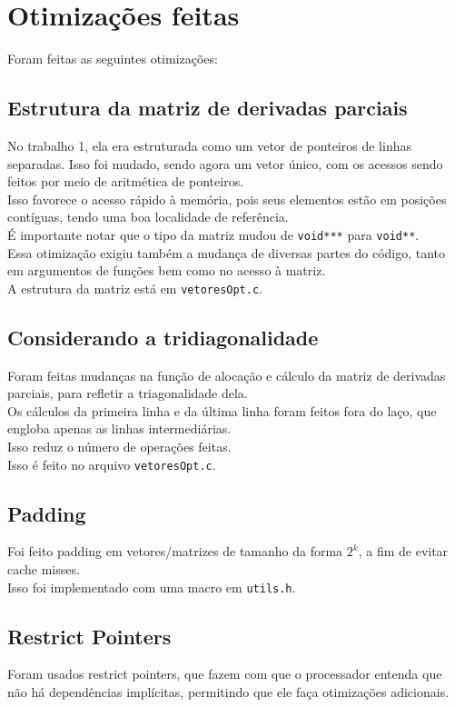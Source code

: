 \documentclass{article}
\begin{document}
\newpage
\section{Otimizações feitas}
Foram feitas as seguintes otimizações:

\subsection{Estrutura da matriz de derivadas parciais}
No trabalho 1, ela era estruturada como um vetor de ponteiros de linhas separadas. Isso foi mudado, sendo agora um vetor único, com os acessos sendo feitos por meio de aritmética de ponteiros.\\
Isso favorece o acesso rápido à memória, pois seus elementos estão em posições contíguas, tendo uma boa localidade de referência.\\
É importante notar que o tipo da matriz mudou de \texttt{void***} para \texttt{void**}.\\
Essa otimização exigiu também a mudança de diversas partes do código, tanto em argumentos de funções bem como no acesso à matriz.\\
A estrutura da matriz está em \texttt{vetoresOpt.c}.

\subsection{Considerando a tridiagonalidade}
Foram feitas mudanças na função de alocação e cálculo da matriz de derivadas parciais, para refletir a triagonalidade dela.\\
Os cálculos da primeira linha e da última linha foram feitos fora do laço, que engloba apenas as linhas intermediárias.\\
Isso reduz o número de operações feitas.\\
Isso é feito no arquivo \texttt{vetoresOpt.c}.

\subsection{Padding}
Foi feito padding em vetores/matrizes de tamanho da forma $2^k$, a fim de evitar cache misses.\\
Isso foi implementado com uma macro em \texttt{utils.h}.

\subsection{Restrict Pointers}
Foram usados restrict pointers, que fazem com que o processador entenda que não há dependências implícitas, permitindo que ele faça otimizações adicionais.
\end{document}
